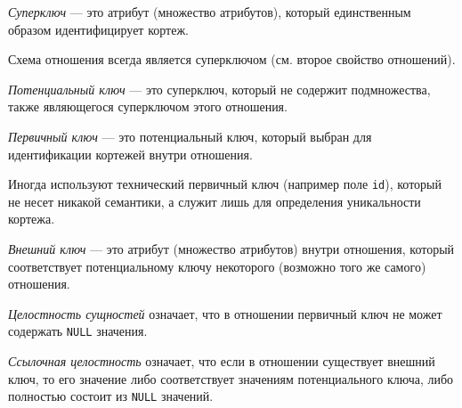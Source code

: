 \begin{definition}
  \textit{Суперключ} --- это атрибут (множество атрибутов),
  который единственным образом идентифицирует кортеж.
\end{definition}

\begin{remark}
  Схема отношения всегда является суперключом (см. второе свойство отношений).
\end{remark}

\begin{definition}
  \textit{Потенциальный ключ} --- это суперключ, который не содержит подмножества,
  также являющегося суперключом этого отношения.
\end{definition}

\begin{definition}
  \textit{Первичный ключ} --- это потенциальный ключ, который выбран для
  идентификации кортежей внутри отношения.
\end{definition}

\begin{remark}
  Иногда используют технический первичный ключ (например поле \texttt{id}),
  который не несет никакой семантики, а служит лишь для определения уникальности
  кортежа.
\end{remark}

\begin{definition}
  \textit{Внешний ключ} --- это атрибут (множество атрибутов) внутри отношения,
  который соответствует потенциальному ключу некоторого (возможно того же самого)
  отношения.
\end{definition}

\begin{definition}
  \textit{Целостность сущностей} означает, что в отношении первичный ключ
  не может содержать \texttt{NULL} значения.
\end{definition}

\begin{definition}
  \textit{Ссылочная целостность} означает, что если в отношении существует
  внешний ключ, то его значение либо соответствует значениям потенциального ключа,
  либо полностью состоит из \texttt{NULL} значений.
\end{definition}
